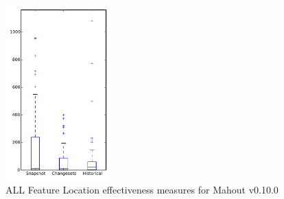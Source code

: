 
\begin{figure}[t]
\centering
\includegraphics[width=0.36\textwidth]{figures/flt/all_mahout}
\caption{ALL Feature Location effectiveness measures for Mahout v0.10.0}
\label{fig:flt:all:mahout}
\end{figure}
